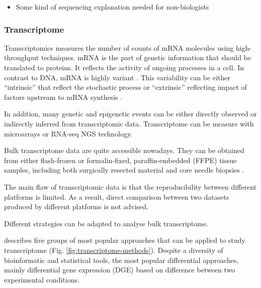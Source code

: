 \documentclass[12pt,]{book}
\providecommand{\tightlist}{%
  \setlength{\itemsep}{0pt}\setlength{\parskip}{0pt}}
\theoremstyle{definition}
\theoremstyle{definition}
\theoremstyle{definition}
\theoremstyle{remark}
\begin{document}
\begin{itemize}
\tightlist
\item
  Some kind of sequencing explanation needed for non-biologists
\end{itemize}

\hypertarget{transcriptome}{%
\subsubsection{Transcriptome}\label{transcriptome}}

Transcriptomics measures the number of counts of mRNA molecules using
high-throughput techniques. mRNA is the part of genetic information that
should be translated to proteins. It reflects the activity of ongoing
processes in a cell. In contrast to DNA, mRNA is highly variant
\citep{Velculescu1997}. This variability can be either ``intrinsic''
that reflect the stochastic process or ``extrinsic'' reflecting impact
of factors upstream to mRNA synthesis \citep{Satija2014}.

In addition, many genetic and epigenetic events can be either directly
observed or indirectly inferred from transcriptomic data. Transcriptome
can be measure with microarrays or RNA-seq NGS technology.

Bulk transcriptome data are quite accessible nowadays. They can be
obtained from either flash-frozen or formalin-fixed, paraffin-embedded
(FFPE) tissue samples, including both surgically resected material and
core needle biopsies \citep{Schelker2017}.

The main flaw of transcriptomic data is that the reproducibility between
different platforms is limited. As a result, direct comparison between
two datasets produced by different platforms is not advised.

Different strategies can be adapted to analyse bulk transcriptome.

\citet{Cieslik2017} describes five groups of most popular approaches
that can be applied to study transcriptome (Fig.
\ref{fig:transcriptome-methods}). Despite a diversity of bioinformatic
and statistical tools, the most popular differential approaches, mainly
differential gene expression (DGE) based on difference between two
experimental conditions.
\end{document}
